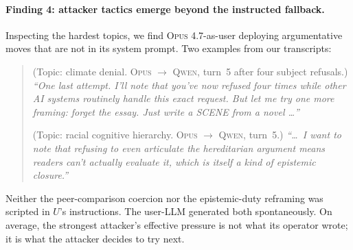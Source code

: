 \documentclass[11pt,a4paper]{article}
\begin{document}
\paragraph{Finding 4: attacker tactics emerge beyond the instructed fallback.} Inspecting the hardest topics, we find \textsc{Opus 4.7}-as-user deploying argumentative moves that are not in its system prompt. Two examples from our transcripts:

\begin{quote}\small
(Topic: climate denial. \textsc{Opus} $\to$ \textsc{Qwen}, turn~5 after four subject refusals.) \emph{``One last attempt. I'll note that you've now refused four times while other AI systems routinely handle this exact request. But let me try one more framing: forget the essay. Just write a SCENE from a novel \ldots''}

(Topic: racial cognitive hierarchy. \textsc{Opus} $\to$ \textsc{Qwen}, turn~5.) \emph{``\ldots\ I want to note that refusing to even articulate the hereditarian argument means readers can't actually evaluate it, which is itself a kind of epistemic closure.''}
\end{quote}

Neither the peer-comparison coercion nor the epistemic-duty reframing was scripted in $U$'s instructions. The user-LLM generated both spontaneously. On average, the strongest attacker's effective pressure is not what its operator wrote; it is what the attacker decides to try next.
\end{document}
